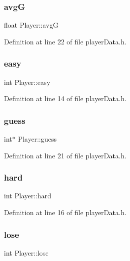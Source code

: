 \subsubsection{\texorpdfstring{avgG}{avgG}}
{\footnotesize\ttfamily float Player\+::avgG}



Definition at line 22 of file player\+Data.\+h.

\hypertarget{struct_player_a76526ba3bcfe75f6061e43baf3542536}{}\label{struct_player_a76526ba3bcfe75f6061e43baf3542536} 
\subsubsection{\texorpdfstring{easy}{easy}}
{\footnotesize\ttfamily int Player\+::easy}



Definition at line 14 of file player\+Data.\+h.

\hypertarget{struct_player_ae7fe2dbcb9cc310b5416c0f80cc2b021}{}\label{struct_player_ae7fe2dbcb9cc310b5416c0f80cc2b021} 
\subsubsection{\texorpdfstring{guess}{guess}}
{\footnotesize\ttfamily int$\ast$ Player\+::guess}



Definition at line 21 of file player\+Data.\+h.

\hypertarget{struct_player_aad026e913430091e49f5c9d4b3aef415}{}\label{struct_player_aad026e913430091e49f5c9d4b3aef415} 
\subsubsection{\texorpdfstring{hard}{hard}}
{\footnotesize\ttfamily int Player\+::hard}



Definition at line 16 of file player\+Data.\+h.

\hypertarget{struct_player_a388103ad515736ae91db28560211feb0}{}\label{struct_player_a388103ad515736ae91db28560211feb0} 
\subsubsection{\texorpdfstring{lose}{lose}}
{\footnotesize\ttfamily int Player\+::lose}



